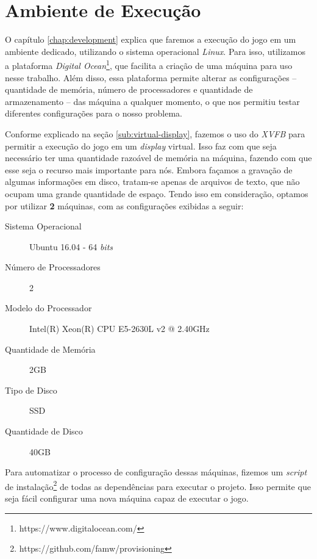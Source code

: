 
\section{\label{section:environment}Ambiente de Execução}

O capítulo \ref{chap:development} explica que faremos a execução do jogo em um
ambiente dedicado, utilizando o sistema operacional \textit{Linux}. Para isso,
utilizamos a plataforma \textit{Digital
Ocean}\footnote{https://www.digitalocean.com/}, que facilita a criação de uma
máquina para uso nesse trabalho. Além disso, essa plataforma permite alterar as
configurações -- quantidade de memória, número de processadores e quantidade de
armazenamento -- das máquina a qualquer momento, o que nos permitiu testar
diferentes configurações para o nosso problema.

Conforme explicado na seção \ref{sub:virtual-display}, fazemos o uso do
\textit{XVFB} para permitir a execução do jogo em um \textit{display} virtual.
Isso faz com que seja necessário ter uma quantidade razoável de memória na
máquina, fazendo com que esse seja o recurso mais importante para nós. Embora
façamos a gravação de algumas informações em disco, tratam-se apenas de
arquivos de texto, que não ocupam uma grande quantidade de espaço. Tendo isso
em consideração, optamos por utilizar \textbf{2} máquinas, com as configurações
exibidas a seguir:

\begin{description}
    \item [Sistema Operacional] Ubuntu 16.04 - 64 \textit{bits}
    \item [Número de Processadores] 2
    \item [Modelo do Processador] Intel(R) Xeon(R) CPU E5-2630L v2 @ 2.40GHz
    \item [Quantidade de Memória] 2GB
    \item [Tipo de Disco] SSD
    \item [Quantidade de Disco] 40GB
\end{description}

Para automatizar o processo de configuração dessas máquinas, fizemos um
\textit{script} de instalação\footnote{https://github.com/famw/provisioning} de
todas as dependências para executar o projeto. Isso permite que seja fácil
configurar uma nova máquina capaz de executar o jogo.

